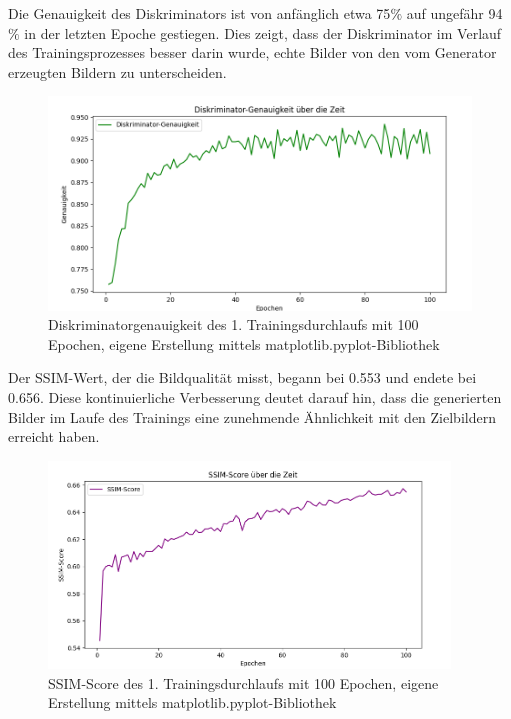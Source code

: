 Die Genauigkeit des Diskriminators ist von anfänglich etwa 75$\%$ auf ungefähr 94$\%$ in der letzten Epoche gestiegen. Dies zeigt, dass der Diskriminator im Verlauf des Trainingsprozesses besser darin wurde, echte Bilder von den vom Generator erzeugten Bildern zu unterscheiden.
\begin{figure}[h]
	\centering
	\includegraphics[width=1.0\textwidth]{images/Pix2PixResults/Genauigkeit0-100.png}
	\caption{Diskriminatorgenauigkeit des 1. Trainingsdurchlaufs mit 100 Epochen, eigene Erstellung mittels matplotlib.pyplot-Bibliothek }
	\label{fig:Genauigkeit 0-100}
\end{figure}

Der SSIM-Wert, der die Bildqualität misst, begann bei 0.553 und endete bei 0.656. Diese kontinuierliche Verbesserung deutet darauf hin, dass die generierten Bilder im Laufe des Trainings eine zunehmende Ähnlichkeit mit den Zielbildern erreicht haben.
\begin{figure}[h]
	\centering
	\includegraphics[width=0.95\textwidth]{images/Pix2PixResults/SSIM0-100.png}
	\caption{SSIM-Score des 1. Trainingsdurchlaufs mit 100 Epochen, eigene Erstellung mittels matplotlib.pyplot-Bibliothek}
	\label{fig:SSIM 0-100}
\end{figure}

